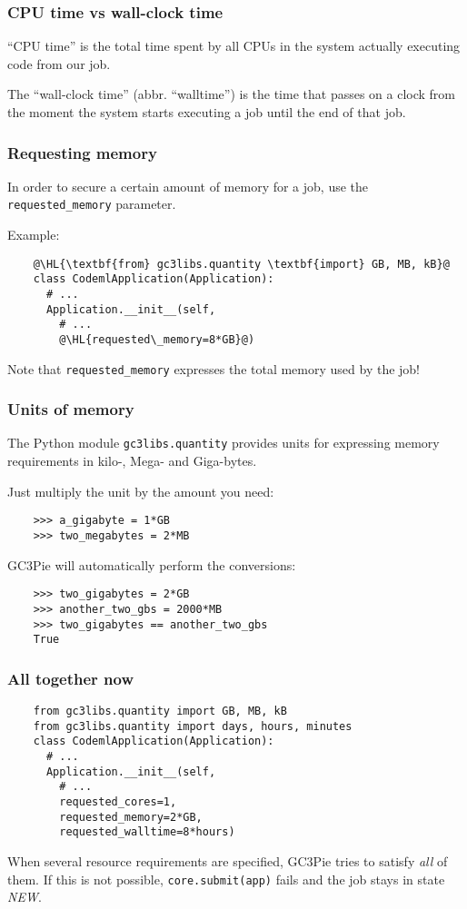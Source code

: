 \documentclass[english,serif,mathserif,xcolor=pdftex,dvipsnames,table]{beamer}
\begin{document}
\begin{frame}
  \frametitle{CPU time vs wall-clock time}
  
  ``CPU time'' is the total time spent by all CPUs in the system
  actually executing code from our job.

  \+ 
  The ``wall-clock time'' (abbr. ``walltime'') is the time that
  passes on a clock from the moment the system starts executing a job
  until the end of that job.
\end{frame}


\begin{frame}[fragile]
  \frametitle{Requesting memory}
  In order to secure a certain amount of memory for a job, use the
  \lstinline|requested_memory| parameter.

  \+
  Example:
  \begin{lstlisting}
    @\HL{\textbf{from} gc3libs.quantity \textbf{import} GB, MB, kB}@
    class CodemlApplication(Application):
      # ...
      Application.__init__(self,
        # ...
        @\HL{requested\_memory=8*GB}@)
  \end{lstlisting}

  \+ 
  Note that \lstinline|requested_memory| expresses the total
  memory used by the job!
\end{frame}

\begin{frame}[fragile]
  \frametitle{Units of memory}
  The Python module \texttt{gc3libs.quantity} provides units for
  expressing memory requirements in kilo-, Mega- and Giga-bytes.

  \+
  Just multiply the unit by the amount you need:
  \begin{lstlisting}
    >>> a_gigabyte = 1*GB
    >>> two_megabytes = 2*MB
  \end{lstlisting}

  \+
  GC3Pie will automatically perform the conversions:
  \begin{lstlisting}
    >>> two_gigabytes = 2*GB
    >>> another_two_gbs = 2000*MB
    >>> two_gigabytes == another_two_gbs
    True
  \end{lstlisting}
\end{frame}


\begin{frame}[fragile]
  \frametitle{All together now}

  \begin{lstlisting}
    from gc3libs.quantity import GB, MB, kB
    from gc3libs.quantity import days, hours, minutes
    class CodemlApplication(Application):
      # ...
      Application.__init__(self,
        # ...
        requested_cores=1,
        requested_memory=2*GB,
        requested_walltime=8*hours)
  \end{lstlisting}

  \+ 
  When several resource requirements are specified, GC3Pie tries to
  satisfy \emph{all} of them.  If this is not possible,
  \lstinline|core.submit(app)| fails and the job stays in state
  \emph{NEW}.
  
\end{frame}
\end{document}

